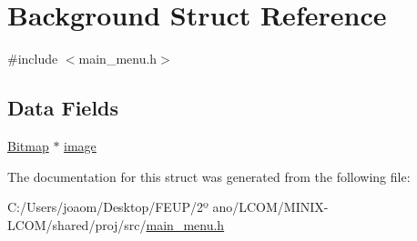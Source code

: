 \hypertarget{struct_background}{}\section{Background Struct Reference}
\label{struct_background}


{\ttfamily \#include $<$main\+\_\+menu.\+h$>$}

\subsection*{Data Fields}
\begin{DoxyCompactItemize}
\item 
\mbox{\hyperlink{struct_bitmap}{Bitmap}} $\ast$ \mbox{\hyperlink{group__main__menu_ga801bef0ab9d72c95bc5d6d6a0d8f2db0}{image}}
\end{DoxyCompactItemize}


The documentation for this struct was generated from the following file\+:\begin{DoxyCompactItemize}
\item 
C\+:/\+Users/joaom/\+Desktop/\+F\+E\+U\+P/2º ano/\+L\+C\+O\+M/\+M\+I\+N\+I\+X-\/\+L\+C\+O\+M/shared/proj/src/\mbox{\hyperlink{main__menu_8h}{main\+\_\+menu.\+h}}\end{DoxyCompactItemize}
